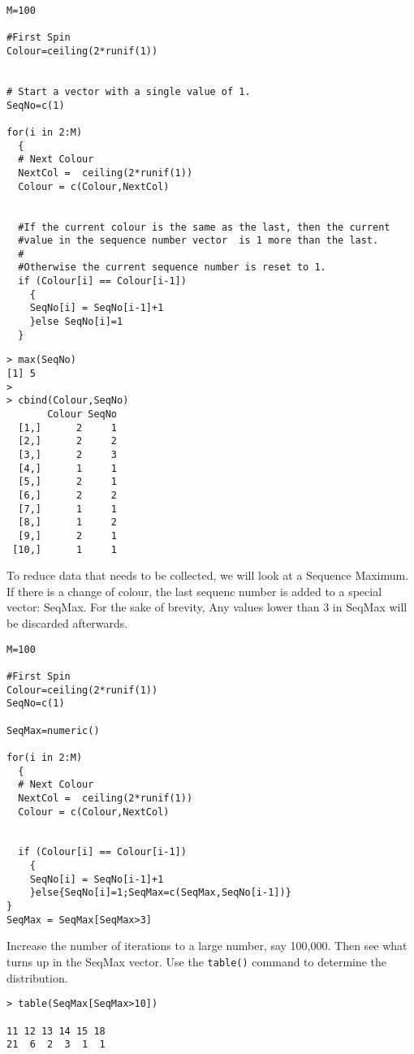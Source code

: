 \documentclass[11pt]{article} %
\begin{document}
\newpage

\begin{framed}
\begin{verbatim}
M=100

#First Spin
Colour=ceiling(2*runif(1))


# Start a vector with a single value of 1.
SeqNo=c(1)  

for(i in 2:M)
  {
  # Next Colour
  NextCol =  ceiling(2*runif(1))
  Colour = c(Colour,NextCol)
  

  #If the current colour is the same as the last, then the current 
  #value in the sequence number vector  is 1 more than the last.
  #
  #Otherwise the current sequence number is reset to 1.
  if (Colour[i] == Colour[i-1])
    {
    SeqNo[i] = SeqNo[i-1]+1
    }else SeqNo[i]=1
  }
\end{verbatim}
\end{framed}
\newpage
\begin{verbatim}
> max(SeqNo)
[1] 5
>
> cbind(Colour,SeqNo)
       Colour SeqNo
  [1,]      2     1
  [2,]      2     2
  [3,]      2     3
  [4,]      1     1
  [5,]      2     1
  [6,]      2     2
  [7,]      1     1
  [8,]      1     2
  [9,]      2     1
 [10,]      1     1
\end{verbatim}
To reduce data that needs to be collected, we will look at a Sequence Maximum. If there is a change of colour, the last sequenc number is added to a special vector:  SeqMax. For the sake of brevity, Any values lower than 3 in SeqMax will be discarded afterwards.
\newpage
\begin{framed}
\begin{verbatim}
M=100

#First Spin
Colour=ceiling(2*runif(1))
SeqNo=c(1)

SeqMax=numeric()

for(i in 2:M)
  {
  # Next Colour
  NextCol =  ceiling(2*runif(1))
  Colour = c(Colour,NextCol)


  if (Colour[i] == Colour[i-1])
    {
    SeqNo[i] = SeqNo[i-1]+1
    }else{SeqNo[i]=1;SeqMax=c(SeqMax,SeqNo[i-1])}
}	
SeqMax = SeqMax[SeqMax>3]
\end{verbatim}
\end{framed}
Increase the number of iterations to a large number, say 100,000. Then see what turns up in the SeqMax vector. Use the \texttt{table()} command to determine the distribution.
\begin{verbatim}
> table(SeqMax[SeqMax>10])

11 12 13 14 15 18 
21  6  2  3  1  1 
\end{verbatim}
\end{document}
